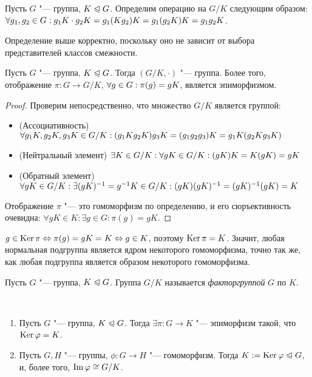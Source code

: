 \begin{definition}
	Пусть $G$ "--- группа, $K \trianglelefteqslant G$. Определим операцию на $G / K$ следующим образом: $\forall g_1, g_2 \in G: g_1K\cdot g_2K \hm= g_1(Kg_2)K = g_1(g_2K)K = g_1g_2K$.
\end{definition}

\begin{note}
	Определение выше корректно, поскольку оно не зависит от выбора представителей классов смежности.
\end{note}

\begin{proposition}
	Пусть $G$ "--- группа, $K \trianglelefteqslant G$. Тогда $(G / K, \cdot)$ "--- группа. Более того, отображение $\pi: G \to G / K$, $\forall g \in G: \pi(g) \hm= gK$, является эпиморфизмом.
\end{proposition}

\begin{proof}
	Проверим непосредственно, что множество $G / K$ является группой:
	\begin{itemize}
		\item (Ассоциативность) $\forall g_1K, g_2K, g_3K \in G / K: (g_1Kg_2K)g_3K \hm= (g_1g_2g_3)K \hm= g_1K(g_2Kg_3K)$
		\item (Нейтральный элемент) $\exists K \in G / K: \forall gK \in G / K: (gK)K \hm= K(gK) = gK$
		\item (Обратный элемент) $\forall gK \in G / K: \exists (gK)^{-1} = g^{-1}K \in G / K: (gK)(gK)^{-1} \hm= (gK)^{-1}(gK) = K$
	\end{itemize}
	
	Отображение $\pi$ "--- это гомоморфизм по определению, и его сюръективность очевидна: $\forall gK \in K: \exists g \in G: \pi(g) = gK$.
\end{proof}

\begin{note}
	$g \in \operatorname{Ker}\pi \Leftrightarrow \pi(g) = gK = K \Leftrightarrow g \in K$, поэтому $\operatorname{Ker}\pi = K$. Значит, любая нормальная подгруппа является ядром некоторого гомоморфизма, точно так же, как любая подгруппа является образом некоторого гомоморфизма.
\end{note}

\begin{definition}
	Пусть $G$ "--- группа, $K \trianglelefteqslant G$. Группа $G / K$ называется \textit{факторгруппой} $G$ по $K$.
\end{definition}

\begin{theorem}~
	\begin{enumerate}
		\item Пусть $G$ "--- группа, $K \trianglelefteqslant G$. Тогда $\exists \pi: G \to K$ "--- эпиморфизм такой, что $\ke\phi \hm= K$.
		\item Пусть $G, H$ "--- группы, $\phi: G \to H$ "--- гомоморфизм. Тогда $K \hm{:=} \ke\phi \normal G$, и, более того, $\operatorname{Im}\varphi \cong G / K$.
	\end{enumerate}
\end{theorem}

